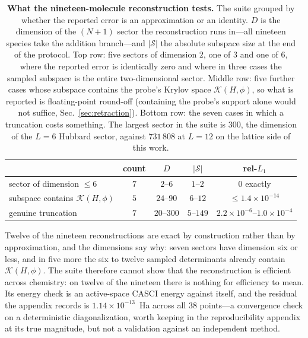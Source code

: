 \begin{table}[tp]\centering\small
\caption{\textbf{What the nineteen-molecule reconstruction tests.} The suite grouped by whether the
reported error is an approximation or an identity. $D$ is the dimension of the $(N{+}1)$ sector the
reconstruction runs in---all nineteen species take the addition branch---and $|\mathcal S|$ the
absolute subspace size at the end of the protocol. Top row: five sectors of
dimension $2$, one of $3$ and one of $6$, where the reported error is identically zero and where in
three cases the sampled subspace is the entire two-dimensional sector. Middle row: five further cases
whose subspace contains the probe's Krylov space $\mathcal K(H,\phi)$, so what is reported is floating-point round-off (containing the probe's support alone would not suffice, Sec.~\ref{sec:retraction}). Bottom row: the seven cases in which a truncation costs something. The largest sector in the
suite is $300$, the dimension of the $L=6$ Hubbard sector, against
$731\,808$ at $L=12$ on the lattice side of this work.}\label{tab:molscope}
\begin{tabular}{lcccc}
\toprule
 & count & $D$ & $|\mathcal S|$ & rel-$L_1$\\
\midrule
sector of dimension $\le6$       & $7$ & $2$--$6$    & $1$--$2$   & $0$ exactly\\
subspace contains $\mathcal K(H,\phi)$ & $5$ & $24$--$90$  & $6$--$12$  & $\le1.4\times10^{-14}$\\
genuine truncation               & $7$ & $20$--$300$ & $5$--$149$ & $2.2\times10^{-6}$--$1.0\times10^{-4}$\\
\bottomrule
\end{tabular}
\end{table}



Twelve of the nineteen reconstructions are exact by construction rather than by approximation, and the
dimensions say why: seven sectors have dimension six or less, and in five more the six to twelve sampled determinants already contain $\mathcal K(H,\phi)$. The suite therefore cannot show that the reconstruction is efficient across chemistry: on twelve of the nineteen there is nothing for efficiency to mean. Its energy check is an active-space CASCI energy against itself, and the residual the appendix records is $1.14\times10^{-13}$~Ha across all
$38$ points---a convergence check on a deterministic diagonalization, worth keeping in the
reproducibility appendix at its true magnitude, but not a validation against an independent method.

